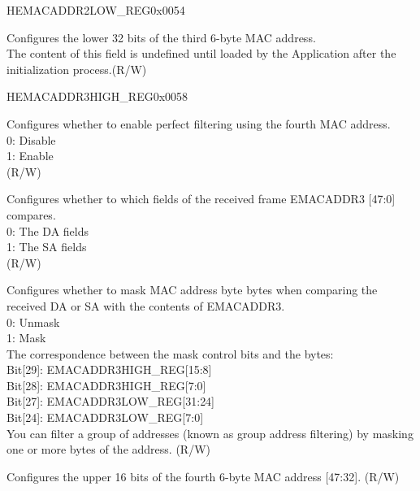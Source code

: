 \begin{register}{H}{EMACADDR2LOW\_REG}{0x0054}\label{regdesc:EMACADDR2LOWREG}
%
\regnewline%
\begin{regdesc}\begin{reglist}
\item [EMACADDR2LOW\_REG] Configures the lower 32 bits of the third 6-byte MAC address.\\The content of this field is undefined until loaded by the Application after the initialization process.(R/W)
\end{reglist}\end{regdesc}
\end{register}

\begin{register}{H}{EMACADDR3HIGH\_REG}{0x0058}\label{regdesc:EMACADDR3HIGHREG}
%
%
%
%
%
\regnewline%
\begin{regdesc}\begin{reglist}
\item [ADDRESS\_ENABLE3] Configures whether to enable perfect filtering using the fourth MAC address.\\
0: Disable\\
1: Enable\\ (R/W)
\item [SOURCE\_ADDRESS3] Configures whether to which fields of the received frame EMACADDR3 [47:0] compares.\\
0: The DA fields\\
1: The SA fields\\ (R/W)
\item [MASK\_BYTE\_CONTROL3] Configures whether to mask MAC address byte bytes when comparing the received DA or SA with the contents of EMACADDR3.\\
0: Unmask\\
1: Mask\\
The correspondence between the mask control bits and the bytes:\\
Bit[29]: EMACADDR3HIGH\_REG[15:8]\\
Bit[28]: EMACADDR3HIGH\_REG[7:0]\\
Bit[27]: EMACADDR3LOW\_REG[31:24]\\
Bit[24]: EMACADDR3LOW\_REG[7:0]\\
You can filter a group of addresses (known as group address filtering) by masking one or more bytes of the address. (R/W)
\item [MAC\_ADDRESS3\_HI] Configures the upper 16 bits of the fourth 6-byte MAC address [47:32]. (R/W)
\end{reglist}\end{regdesc}
\end{register}


